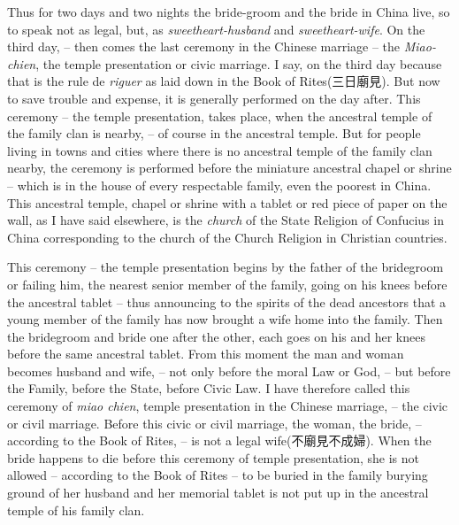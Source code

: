 Thus for two days and two nights the bride-groom and the bride in China live,
so to speak not as legal, but, as \emph{sweetheart-husband} and \emph{sweetheart-wife}.
On the third day,  -- then comes the last ceremony in the Chinese marriage
-- the \emph{Miao-chien}, the temple presentation or civic marriage.
I say, on the third day because that is the rule de \emph{riguer} as laid down in the Book of Rites(三日廟見).
But now to save trouble and expense,
it is generally performed on the day after.
This ceremony
-- the temple presentation, takes place,
when the ancestral temple of the family clan is nearby,
-- of course in the ancestral temple.
But for people living in towns and cities where there is no ancestral temple of the family clan nearby,
the ceremony is performed before the miniature ancestral chapel or shrine
-- which is in the house of every respectable family, even the poorest in China.
This ancestral temple, chapel or shrine with a tablet or red piece of paper on the wall,
as I have said elsewhere,
is the \emph{church} of the State Religion of Confucius in China corresponding to the church of the Church Religion in Christian countries.

This ceremony -- the temple presentation begins by the father of the bridegroom or failing him, the nearest senior member of the family,
going on his knees before the ancestral tablet
-- thus announcing to the spirits of the dead ancestors that a young member of the family has now brought a wife home into the family.
Then the bridegroom and bride one after the other, each goes on his and her knees before the same ancestral tablet.
From this moment the man and woman becomes husband and wife,
-- not only before the moral Law or God,
-- but before the Family, before the State, before Civic Law.
I have therefore called this ceremony of \emph{miao chien},
temple presentation in the Chinese marriage,
-- the civic or civil marriage. Before this civic or civil marriage, the woman, the bride,
-- according to the Book of Rites,
-- is not a legal wife(不廟見不成婦).
When the bride happens to die before this ceremony of temple presentation, she is not allowed
-- according to the Book of Rites
-- to be buried in the family burying ground of her husband and her memorial tablet is not put up in the ancestral temple of his family clan.

